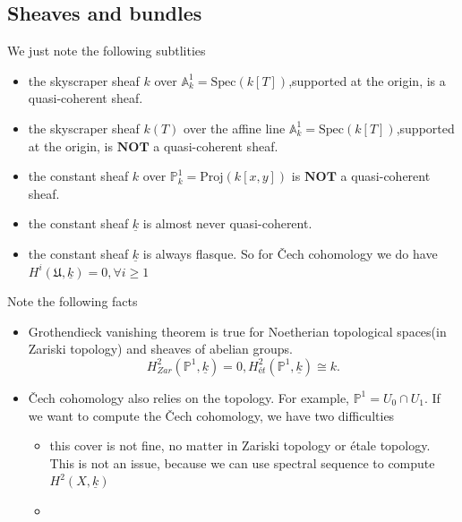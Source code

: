 \documentclass[main.tex]{subfiles}
\begin{document}
\subsection{Sheaves and bundles}
\begin{example}
We just note the following subtlities
\begin{itemize}
\item  the skyscraper sheaf $k$ over $\mathbb{A}_{k}^{1}=\mathrm{Spec}(k[T])$,supported at the origin, is a quasi-coherent sheaf.
\item the skyscraper sheaf $k(T)$ over the affine line $\mathbb{A}_{k}^{1}=\mathrm{Spec}(k[T])$,supported at the origin, is $\mathbf{NOT}$ a quasi-coherent sheaf.
\item  the constant sheaf $k$ over  $\mathbb{P}_{k}^{1}=\mathrm{Proj}(k[x,y])$ is $\mathbf{NOT}$ a quasi-coherent sheaf.
\item the constant sheaf $\underline{k}$ is almost never quasi-coherent. 
\item the constant sheaf $\underline{k}$ is always flasque. So for \v{C}ech cohomology we do have $H^{i}(\mathfrak{U}, \underline{k})=0, \forall i\geq 1$
\end{itemize}
\end{example}
\begin{remark}
 Note the following facts
 \begin{itemize}
 \item Grothendieck vanishing theorem is true for Noetherian topological spaces(in Zariski topology) and sheaves of abelian groups. 
 $$H^{2}_{Zar}(\mathbb{P}^{1},\underline{k})=0, H^{2}_{ét}(\mathbb{P}^{1}, \underline{k})\cong k.$$
 \item Čech cohomology also relies on the topology. For example, $\mathbb{P}^{1}=U_{0}\cap U_{1}$. If we want to compute the Čech cohomology, we have two difficulties
 \begin{itemize}
 \item this cover is not fine, no matter in Zariski topology or étale topology. This is not an issue, because we can use spectral sequence to compute $H^{2}(X,\underline{k})$
 \item 
 \end{itemize}
 \end{itemize}
\end{remark}
\end{document}
